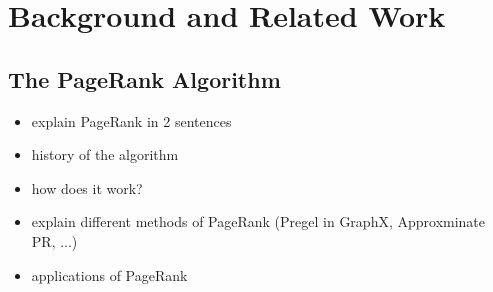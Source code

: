 \section{Background and Related Work}
\subsection{The PageRank Algorithm}

\begin{itemize}
  \item explain PageRank in 2 sentences
  \item history of the algorithm
  \item how does it work? 
  \item explain different methods of PageRank (Pregel in GraphX, Approxminate PR, ...)
  \item applications of PageRank
\end{itemize}

